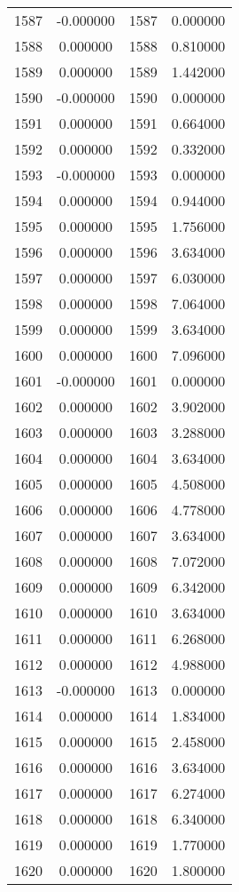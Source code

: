 \documentclass[12pt]{article}
\begin{document}
\begin{longtable}{@{}cccc@{}}
1587 & -0.000000 & 1587 & 0.000000 \\
1588 & 0.000000 & 1588 & 0.810000 \\
1589 & 0.000000 & 1589 & 1.442000 \\
1590 & -0.000000 & 1590 & 0.000000 \\
1591 & 0.000000 & 1591 & 0.664000 \\
1592 & 0.000000 & 1592 & 0.332000 \\
1593 & -0.000000 & 1593 & 0.000000 \\
1594 & 0.000000 & 1594 & 0.944000 \\
1595 & 0.000000 & 1595 & 1.756000 \\
1596 & 0.000000 & 1596 & 3.634000 \\
1597 & 0.000000 & 1597 & 6.030000 \\
1598 & 0.000000 & 1598 & 7.064000 \\
1599 & 0.000000 & 1599 & 3.634000 \\
1600 & 0.000000 & 1600 & 7.096000 \\
1601 & -0.000000 & 1601 & 0.000000 \\
1602 & 0.000000 & 1602 & 3.902000 \\
1603 & 0.000000 & 1603 & 3.288000 \\
1604 & 0.000000 & 1604 & 3.634000 \\
1605 & 0.000000 & 1605 & 4.508000 \\
1606 & 0.000000 & 1606 & 4.778000 \\
1607 & 0.000000 & 1607 & 3.634000 \\
1608 & 0.000000 & 1608 & 7.072000 \\
1609 & 0.000000 & 1609 & 6.342000 \\
1610 & 0.000000 & 1610 & 3.634000 \\
1611 & 0.000000 & 1611 & 6.268000 \\
1612 & 0.000000 & 1612 & 4.988000 \\
1613 & -0.000000 & 1613 & 0.000000 \\
1614 & 0.000000 & 1614 & 1.834000 \\
1615 & 0.000000 & 1615 & 2.458000 \\
1616 & 0.000000 & 1616 & 3.634000 \\
1617 & 0.000000 & 1617 & 6.274000 \\
1618 & 0.000000 & 1618 & 6.340000 \\
1619 & 0.000000 & 1619 & 1.770000 \\
1620 & 0.000000 & 1620 & 1.800000 \\

\end{longtable}
\end{document}
